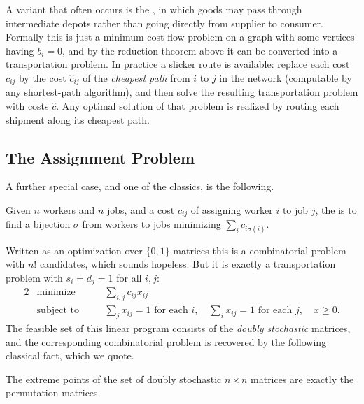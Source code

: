 \begin{remark}[Transshipment]
    A variant that often occurs is the , in which goods may pass through intermediate depots rather than going directly from supplier to consumer. Formally this is just a minimum cost flow problem on a graph with some vertices having $b_i = 0$, and by the reduction theorem above it can be converted into a transportation problem. In practice a slicker route is available: replace each cost $c_{ij}$ by the cost $\hat c_{ij}$ of the \emph{cheapest path} from $i$ to $j$ in the network (computable by any shortest-path algorithm), and then solve the resulting transportation problem with costs $\hat c$. Any optimal solution of that problem is realized by routing each shipment along its cheapest path.
\end{remark}

\subsection{The Assignment Problem}

A further special case, and one of the classics, is the following.

\begin{definition}
    Given $n$ workers and $n$ jobs, and a cost $c_{ij}$ of assigning worker $i$ to job $j$, the  is to find a bijection $\sigma$ from workers to jobs minimizing $\sum_i c_{i\sigma(i)}$.
\end{definition}

Written as an optimization over $\{0,1\}$-matrices this is a combinatorial problem with $n!$ candidates, which sounds hopeless. But it is exactly a transportation problem with $s_i = d_j = 1$ for all $i, j$:
\begin{alignat*}{2}
    & \text{minimize} \quad && \sum_{i,j}c_{ij}x_{ij} \\
    & \text{subject to} \quad && \textstyle\sum_j x_{ij} = 1 \text{ for each } i,\quad \sum_i x_{ij} = 1 \text{ for each } j,\quad x \geq 0.
\end{alignat*}
The feasible set of this linear program consists of the \emph{doubly stochastic} matrices, and the corresponding combinatorial problem is recovered by the following classical fact, which we quote.

\begin{theorem}
    The extreme points of the set of doubly stochastic $n \times n$ matrices are exactly the permutation matrices.
\end{theorem}

